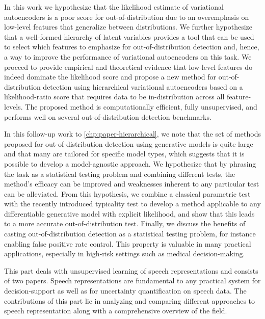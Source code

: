 In this work we hypothesize that the likelihood estimate of variational autoencoders is a poor score for out-of-distribution due to an overemphasis on low-level features that generalize between distributions. 
We further hypothesize that a well-formed hierarchy of latent variables provides a tool that can be used to select which features to emphasize for out-of-distribution detection and, hence, a way to improve the performance of variational autoencoders on this task. 
We proceed to provide empirical and theoretical evidence that low-level features do indeed dominate the likelihood score and propose a new method for out-of-distribution detection using hierarchical variational autoencoders based on a likelihood-ratio score that requires data to be in-distribution across all feature-levels. 
The proposed method is computationally efficient, fully unsupervised, and performs well on several out-of-distribution detection benchmarks. 

In this follow-up work to \cref{chp:paper-hierarchical}, we note that the set of methods proposed for out-of-distribution detection using generative models is quite large and that many are tailored for specific model types, which suggests that it is possible to develop a model-agnostic approach. We hypothesize that by phrasing the task as a statistical testing problem and combining different tests, the method's efficacy can be improved and weaknesses inherent to any particular test can be alleviated. 
From this hypothesis, we combine a classical parametric test with the recently introduced typicality test to develop a method applicable to any differentiable  generative model with explicit likelihood, and show that this leads to a more accurate out-of-distribution test. 
Finally, we discuss the benefits of casting out-of-distribution detection as a statistical testing problem, for instance enabling false positive rate control. This property is valuable in many practical applications, especially in high-risk settings such as medical decision-making.


This part deals with unsupervised learning of speech representations and consists of two papers. Speech representations are fundamental to any practical system for decision-support as well as for uncertainty quantification on speech data. 
The contributions of this part lie in analyzing and comparing different approaches to speech representation along with a comprehensive overview of the field.

